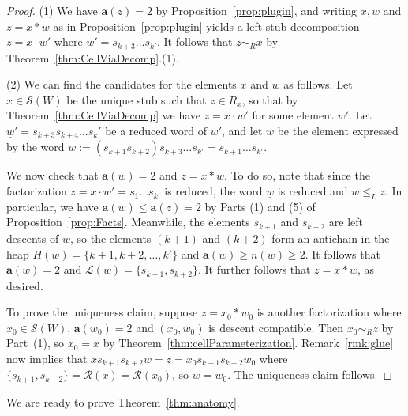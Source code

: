 \documentclass[ALCO,Unicode,published]{cedram}
\newcommand{\call}{\mathcal{L}}
\newcommand{\calr}{\mathcal{R}}
\newcommand{\la}{\mathbf{a}}
\newcommand{\sw}{\mathcal{S}(W)}
\newcommand{\ul}{\underline}
\begin{document}
\begin{proof} 
(1) We have $\la(z)=2$ by Proposition~\ref{prop:plugin}, and writing $\ul x, \ul w$ and $\ul z=\ul x*\ul w$ as
in Proposition~\ref{prop:plugin} yields a left stub decomposition $z=x\cdot w'$ where $w'=s_{k+3}\dots s_{k'}$.
It follows that $z\sim_R x$ by Theorem~\ref{thm:CellViaDecomp}.(1).

\noindent
(2) We can find the candidates for the elements $x$ and $w$ as follows. Let $x\in \sw$ be the unique
stub such that $z\in R_x$, so that by Theorem~\ref{thm:CellViaDecomp} we have $z=x\cdot w'$ for some
element $w'$. Let $\ul w'=s_{k+3}s_{k+4}\dots s_k'$ be a reduced word of $w'$, and let $w$ be the
element expressed by the word $\ul w:=(s_{k+1}s_{k+2}) s_{k+3}\dots s_{k'}=s_{k+1}\dots s_{k'}$.

We now check that $\la(w)=2$ and $z=x*w$. To do so, note that since the factorization $z=x\cdot
w'=s_1\dots s_{k'}$ is reduced, the word $\ul w$ is reduced and $w\le_L z$. In particular, we have
$\la(w)\le \la(z)=2$ by Parts (1) and (5) of Proposition~\ref{prop:Facts}. Meanwhile, the elements $s_{k+1}$
and $s_{k+2}$ are left descents of $w$, so the elements $(k+1)$ and $(k+2)$ form an antichain in the
heap $H(w)=\{k+1, k+2,\dots,k'\}$ and $\la(w)\ge n(w)\ge 2$. It follows that $\la(w)=2$ and
$\call(w)=\{s_{k+1},s_{k+2}\}$.  It further follows that $z=x*w$, as desired.

To prove the uniqueness claim, suppose $z=x_0*w_0$ is another factorization where $x_0\in \sw$,
$\la(w_0)=2$ and $(x_0,w_0)$ is descent compatible. Then $x_0\sim_R z$ by Part~(1), so $x_0=x$ by
Theorem~\ref{thm:cellParameterization}. Remark~\ref{rmk:glue} now implies that
$xs_{k+1}s_{k+2}w=z=x_0s_{k+1}s_{k+2}w_0$ where $\{s_{k+1},s_{k+2}\}=\calr(x)=\calr(x_0)$, so
$w=w_0$.  The uniqueness claim follows. 
\end{proof}
  
We are ready to prove Theorem~\ref{thm:anatomy}.
\end{document}
